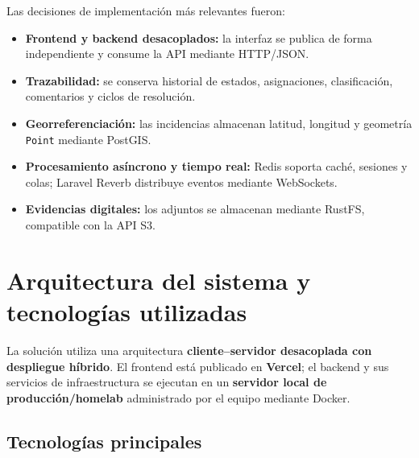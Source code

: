 \documentclass[12pt,a4paper]{article}
\begin{document}
Las decisiones de implementación más relevantes fueron:
\begin{itemize}
    \item \textbf{Frontend y backend desacoplados:} la interfaz se publica de forma independiente y consume la API mediante HTTP/JSON.
    \item \textbf{Trazabilidad:} se conserva historial de estados, asignaciones, clasificación, comentarios y ciclos de resolución.
    \item \textbf{Georreferenciación:} las incidencias almacenan latitud, longitud y geometría \texttt{Point} mediante PostGIS.
    \item \textbf{Procesamiento asíncrono y tiempo real:} Redis soporta caché, sesiones y colas; Laravel Reverb distribuye eventos mediante WebSockets.
    \item \textbf{Evidencias digitales:} los adjuntos se almacenan mediante RustFS, compatible con la API S3.
\end{itemize}

\section{Arquitectura del sistema y tecnologías utilizadas}

La solución utiliza una arquitectura \textbf{cliente--servidor desacoplada con despliegue híbrido}. El frontend está publicado en \textbf{Vercel}; el backend y sus servicios de infraestructura se ejecutan en un \textbf{servidor local de producción/homelab} administrado por el equipo mediante Docker.

\subsection{Tecnologías principales}
\end{document}
